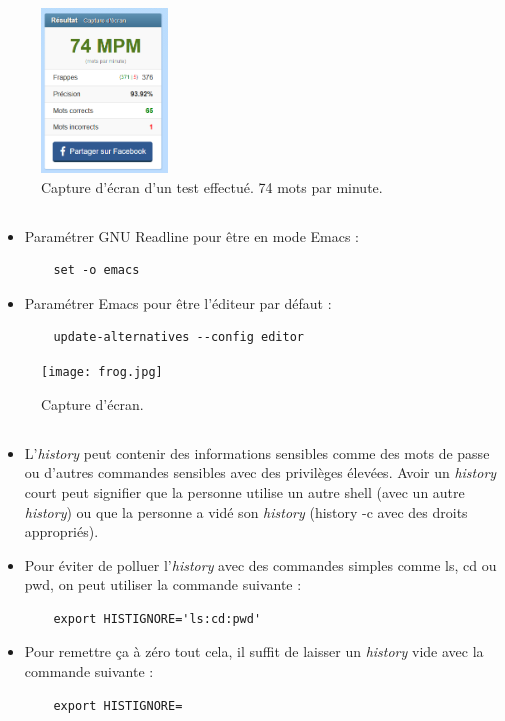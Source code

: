 \documentclass{article}
\begin{document}
\begin{figure}[h]
\centering
\includegraphics[width=0.3\textwidth]{fastfings.png}
\caption{\label{fig:frog}Capture d'écran d'un test effectué. 74 mots par minute.}
\end{figure}

\subsection{}

\begin{itemize}
    \item Paramétrer GNU Readline pour être en mode Emacs :
    \begin{lstlisting}
    set -o emacs
    \end{lstlisting}
    \item Paramétrer Emacs pour être l’éditeur par défaut :
    \begin{lstlisting}
    update-alternatives --config editor
    \end{lstlisting}
\end{itemize}

\begin{figure}[h]
\centering
\texttt{[image: frog.jpg]}
\caption{\label{fig:frog}Capture d'écran.}
\end{figure}

\subsection{}

\begin{itemize}
    \item L’\emph{history} peut contenir des informations sensibles comme des mots de passe ou d’autres commandes sensibles avec des privilèges élevées. Avoir un \emph{history} court peut signifier que la personne utilise un autre shell (avec un autre \emph{history}) ou que la personne a vidé son \emph{history} (history -c avec des droits appropriés).
    \item Pour éviter de polluer l’\emph{history} avec des commandes simples comme ls, cd ou pwd, on peut utiliser la commande suivante :
    \begin{lstlisting}
    export HISTIGNORE='ls:cd:pwd'
    \end{lstlisting}
    \item Pour remettre ça à zéro tout cela, il suffit de laisser un \emph{history} vide avec la commande suivante :
    \begin{lstlisting}
    export HISTIGNORE=
    \end{lstlisting}
\end{itemize}
\end{document}
